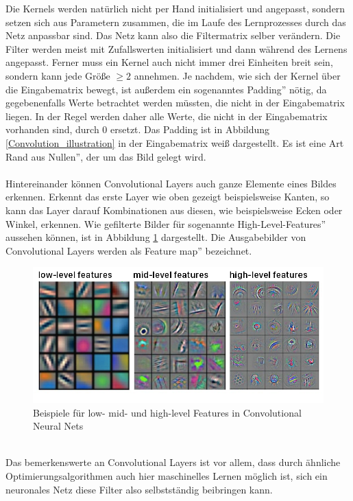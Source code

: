 \documentclass[11pt]{article}
\begin{document}
Die Kernels werden natürlich nicht per Hand initialisiert und angepasst, sondern setzen sich aus Parametern zusammen, die im Laufe des Lernprozesses durch das Netz anpassbar sind. Das Netz kann also die Filtermatrix selber verändern. Die Filter werden meist mit Zufallswerten initialisiert und dann während des Lernens  angepasst. Ferner muss ein Kernel auch nicht immer drei Einheiten breit sein, sondern kann jede Größe $\ge2$ annehmen. Je nachdem, wie sich der Kernel über die Eingabematrix bewegt, ist außerdem ein sogenanntes \glqq Padding'' nötig, da gegebenenfalls Werte betrachtet werden müssten, die nicht in der Eingabematrix liegen. In der Regel werden daher alle Werte, die nicht in der Eingabematrix vorhanden sind, durch 0 ersetzt. Das Padding ist in Abbildung \ref{Convolution_illustration} in der Eingabematrix weiß dargestellt. Es ist eine Art \glqq Rand aus Nullen'', der um das Bild gelegt wird.
\\ 
\\
Hintereinander können Convolutional Layers auch ganze Elemente eines Bildes erkennen. Erkennt das erste Layer wie oben gezeigt beispielsweise Kanten, so kann das Layer darauf Kombinationen aus diesen, wie beispielsweise Ecken oder Winkel, erkennen. Wie gefilterte Bilder für sogenannte \glqq High-Level-Features'' aussehen können, ist in Abbildung \ref{HL_features_conv} dargestellt. Die Ausgabebilder von Convolutional Layers werden als \glqq Feature map'' bezeichnet.
\begin{figure}[h]
	\includegraphics[width=\linewidth]{../graphics/features.png}
	\caption[Beispiele für low-, mid- und high-level Features in Convolutional Neural Nets\newline
	Quelle: https://tvirdi.github.io/2017-10-29/cnn/]{Beispiele für low- mid- und high-level Features in Convolutional Neural Nets}
	\label{HL_features_conv}
\end{figure}
\\
Das bemerkenswerte an Convolutional Layers ist vor allem, dass durch ähnliche Optimierungsalgorithmen auch hier maschinelles Lernen möglich ist, sich ein neuronales Netz diese Filter also selbstständig beibringen kann.
\end{document}
